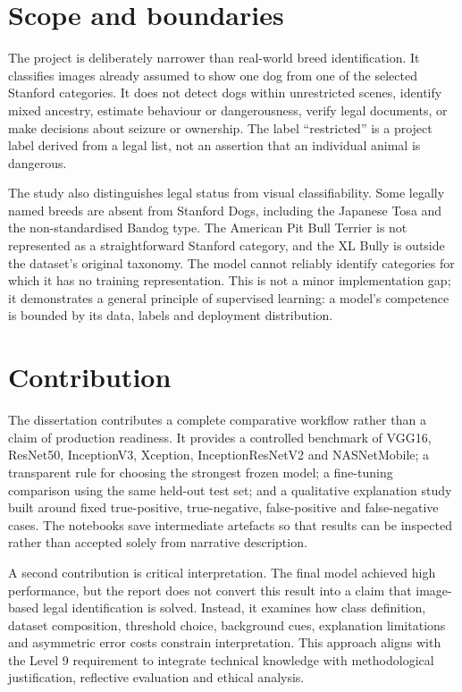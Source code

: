 \section{Scope and boundaries}
The project is deliberately narrower than real-world breed identification. It classifies images already assumed to show one dog from one of the selected Stanford categories. It does not detect dogs within unrestricted scenes, identify mixed ancestry, estimate behaviour or dangerousness, verify legal documents, or make decisions about seizure or ownership. The label ``restricted'' is a project label derived from a legal list, not an assertion that an individual animal is dangerous.

The study also distinguishes legal status from visual classifiability. Some legally named breeds are absent from Stanford Dogs, including the Japanese Tosa and the non-standardised Bandog type. The American Pit Bull Terrier is not represented as a straightforward Stanford category, and the XL Bully is outside the dataset's original taxonomy. The model cannot reliably identify categories for which it has no training representation. This is not a minor implementation gap; it demonstrates a general principle of supervised learning: a model's competence is bounded by its data, labels and deployment distribution.

\section{Contribution}
The dissertation contributes a complete comparative workflow rather than a claim of production readiness. It provides a controlled benchmark of VGG16, ResNet50, InceptionV3, Xception, InceptionResNetV2 and NASNetMobile; a transparent rule for choosing the strongest frozen model; a fine-tuning comparison using the same held-out test set; and a qualitative explanation study built around fixed true-positive, true-negative, false-positive and false-negative cases. The notebooks save intermediate artefacts so that results can be inspected rather than accepted solely from narrative description.

A second contribution is critical interpretation. The final model achieved high performance, but the report does not convert this result into a claim that image-based legal identification is solved. Instead, it examines how class definition, dataset composition, threshold choice, background cues, explanation limitations and asymmetric error costs constrain interpretation. This approach aligns with the Level 9 requirement to integrate technical knowledge with methodological justification, reflective evaluation and ethical analysis.

